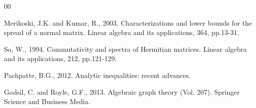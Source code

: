 \documentclass[10pt,a4paper,oneside]{article}
\begin{document}
\begin{thebibliography}{00}


  Merikoski, J.K. and Kumar, R., 2003. Characterizations and lower bounds for the spread of a normal matrix. Linear algebra and its applications, 364, pp.13-31.

   So, W., 1994. Commutativity and spectra of Hermitian matrices. Linear algebra and its applications, 212, pp.121-129.

 Pachpatte, B.G., 2012. Analytic inequalities: recent advances.

 Godsil, C. and Royle, G.F., 2013. Algebraic graph theory (Vol. 207). Springer Science and Business Media.


\end{thebibliography}
\end{document}
